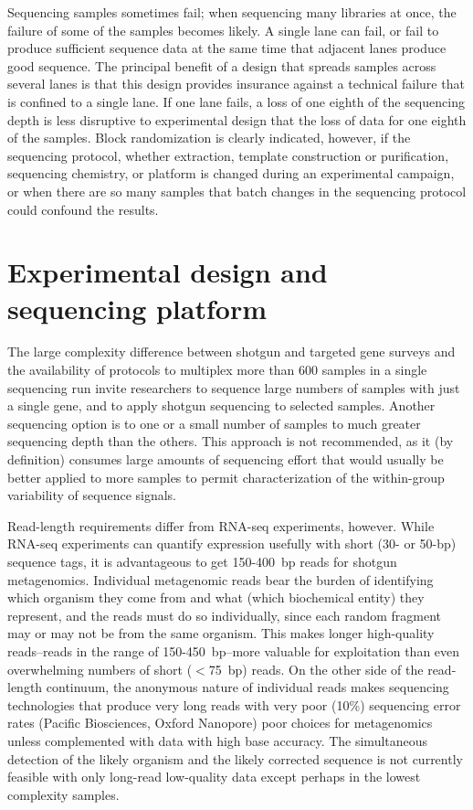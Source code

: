 \documentclass[graybox]{svmult}
\begin{document}
Sequencing samples sometimes fail; when sequencing many libraries at once, the failure of some of the samples becomes likely.   
A single lane can fail, or fail to produce sufficient sequence data at the same time that adjacent lanes produce good sequence.
The principal benefit of a design that spreads samples across several lanes is that this design provides insurance against a technical failure that is confined to a single lane.  If one lane fails, a loss of one eighth of the sequencing depth is less disruptive to experimental design that the loss of data for one eighth of the samples.   Block randomization is clearly indicated, however, if the sequencing protocol, whether extraction, template construction or purification, sequencing chemistry, or platform is changed during an experimental campaign, or when there are so many samples that batch changes in the sequencing protocol could confound the results.

\section{Experimental design and sequencing platform }
\label{sec:2}


The large complexity difference between shotgun and targeted gene surveys and the availability of protocols to multiplex more than 600 samples in a single sequencing run invite researchers to sequence large numbers of samples with just a single gene, and to apply shotgun sequencing to selected samples.   Another sequencing option is to one or a small number of samples to much greater sequencing depth than the others.  This approach is not recommended, as it (by definition) consumes large amounts of sequencing effort that would usually be better applied to more samples to permit characterization of the within-group variability of sequence signals.

Read-length requirements differ from RNA-seq experiments, however.   While RNA-seq experiments can quantify expression usefully with short (30- or 50-bp) sequence tags,  it is advantageous to get 150-400~bp reads for shotgun metagenomics.   Individual metagenomic reads bear the burden of identifying which organism they come from and what (which biochemical entity) they represent, and the reads must do so individually, since each random fragment may or may not be from the same organism.  This makes longer high-quality reads--reads in the range of 150-450~bp--more valuable for exploitation than even overwhelming numbers of short ($<$75~bp) reads.   On the other side of the read-length continuum, the anonymous nature of individual reads makes sequencing technologies that produce very long reads with very poor (10\%) sequencing error rates (Pacific Biosciences, Oxford Nanopore) poor choices for metagenomics unless complemented with data with high base accuracy.  The simultaneous detection of the likely organism and the likely corrected sequence is not currently feasible with only long-read low-quality data except perhaps in the lowest complexity samples.
\end{document}
